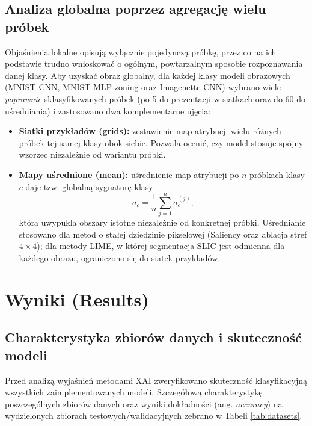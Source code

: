 \documentclass[10pt,journal,compsoc]{IEEEtran}
\begin{document}
\subsection{Analiza globalna poprzez agregację wielu próbek}
Objaśnienia lokalne opisują wyłącznie pojedynczą próbkę, przez co na ich podstawie trudno wnioskować o ogólnym, powtarzalnym sposobie rozpoznawania danej klasy. Aby uzyskać obraz globalny, dla każdej klasy modeli obrazowych (MNIST CNN, MNIST MLP zoning oraz Imagenette CNN) wybrano wiele \emph{poprawnie} sklasyfikowanych próbek (po 5 do prezentacji w siatkach oraz do 60 do uśredniania) i zastosowano dwa komplementarne ujęcia:
\begin{itemize}
    \item \textbf{Siatki przykładów (grids):} zestawienie map atrybucji wielu różnych próbek tej samej klasy obok siebie. Pozwala ocenić, czy model stosuje spójny wzorzec niezależnie od wariantu próbki.
    \item \textbf{Mapy uśrednione (mean):} uśrednienie map atrybucji po $n$ próbkach klasy $c$ daje tzw. globalną sygnaturę klasy
    \begin{equation}
    \bar{a}_c = \frac{1}{n}\sum_{j=1}^{n} a^{(j)}_c,
    \end{equation}
    która uwypukla obszary istotne niezależnie od konkretnej próbki. Uśrednianie stosowano dla metod o stałej dziedzinie pikselowej (Saliency oraz ablacja stref $4\times4$); dla metody LIME, w której segmentacja SLIC jest odmienna dla każdego obrazu, ograniczono się do siatek przykładów.
\end{itemize}


\section{Wyniki (Results)}

\subsection{Charakterystyka zbiorów danych i skuteczność modeli}
Przed analizą wyjaśnień metodami XAI zweryfikowano skuteczność klasyfikacyjną wszystkich zaimplementowanych modeli. Szczegółową charakterystykę poszczególnych zbiorów danych oraz wyniki dokładności (ang. \textit{accuracy}) na wydzielonych zbiorach testowych/walidacyjnych zebrano w Tabeli \ref{tab:datasets}.
\end{document}
